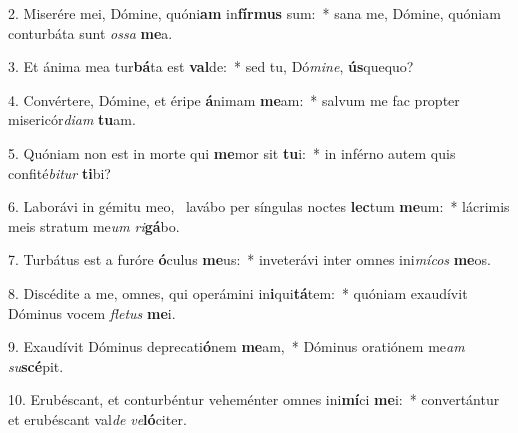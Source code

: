 2. Miserére mei, Dómine, quóni\textbf{am} in\textbf{fír}\textbf{mus} sum:~*  sana me, Dómine, quóniam conturbáta sunt \textit{os}\textit{sa} \textbf{me}a.\

3. Et ánima mea tur\textbf{bá}ta est \textbf{val}de:~*  sed tu, Dó\textit{mi}\textit{ne}, \textbf{ús}quequo?\

4. Convértere, Dómine, et éripe \textbf{á}nimam \textbf{me}am:~*  salvum me fac propter misericór\textit{di}\textit{am} \textbf{tu}am.\

5. Quóniam non est in morte qui \textbf{me}mor sit \textbf{tu}i:~*  in inférno autem quis confité\textit{bi}\textit{tur} \textbf{ti}bi?\

6. Laborávi in gémitu meo, \dag\  lavábo per síngulas noctes \textbf{lec}tum \textbf{me}um:~*  lácrimis meis stratum me\textit{um} \textit{ri}\textbf{gá}bo.\

7. Turbátus est a furóre \textbf{ó}culus \textbf{me}us:~*  inveterávi inter omnes ini\textit{mí}\textit{cos} \textbf{me}os.\

8. Discédite a me, omnes, qui operámini in\textbf{i}qui\textbf{tá}tem:~*  quóniam exaudívit Dóminus vocem \textit{fle}\textit{tus} \textbf{me}i.\

9. Exaudívit Dóminus deprecati\textbf{ó}nem \textbf{me}am,~*  Dóminus oratiónem me\textit{am} \textit{su}\textbf{scé}pit.\

10. Erubéscant, et conturbéntur veheménter omnes ini\textbf{mí}ci \textbf{me}i:~*  convertántur et erubéscant val\textit{de} \textit{ve}\textbf{ló}citer.\

